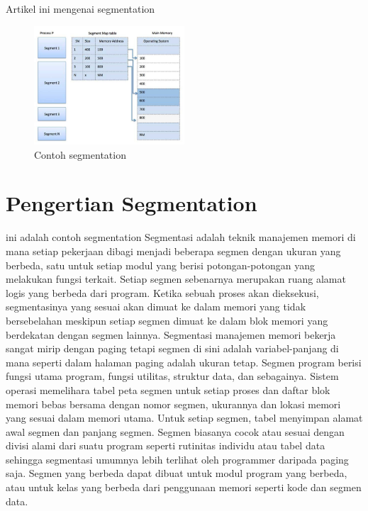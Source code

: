﻿%


Artikel ini mengenai segmentation

  \begin{figure}[ht]
\centerline{\includegraphics[width=0.5\textwidth]{figures/segmentation.jpg}}
  \caption{Contoh segmentation}
  \label{segmentation}
  \end{figure}

\section{Pengertian Segmentation}
ini adalah contoh segmentation \cite{segmentation}
Segmentasi adalah teknik manajemen memori di mana setiap pekerjaan dibagi menjadi beberapa segmen dengan ukuran yang berbeda, satu untuk setiap modul yang berisi potongan-potongan yang melakukan fungsi terkait. Setiap segmen sebenarnya merupakan ruang alamat logis yang berbeda dari program. Ketika sebuah proses akan dieksekusi, segmentasinya yang sesuai akan dimuat ke dalam memori yang tidak bersebelahan meskipun setiap segmen dimuat ke dalam blok memori yang berdekatan dengan segmen lainnya.
Segmentasi manajemen memori bekerja sangat mirip dengan paging tetapi segmen di sini adalah variabel-panjang di mana seperti dalam halaman paging adalah ukuran tetap.
Segmen program berisi fungsi utama program, fungsi utilitas, struktur data, dan sebagainya. Sistem operasi memelihara tabel peta segmen untuk setiap proses dan daftar blok memori bebas bersama dengan nomor segmen, ukurannya dan lokasi memori yang sesuai dalam memori utama. Untuk setiap segmen, tabel menyimpan alamat awal segmen dan panjang segmen.
Segmen biasanya cocok atau sesuai dengan divisi alami dari suatu program seperti rutinitas individu atau tabel data sehingga segmentasi umumnya lebih terlihat oleh programmer daripada paging saja.  Segmen yang berbeda dapat dibuat untuk modul program yang berbeda, atau untuk kelas yang berbeda dari penggunaan memori seperti kode dan segmen data\cite{cepulis1992computer}.

